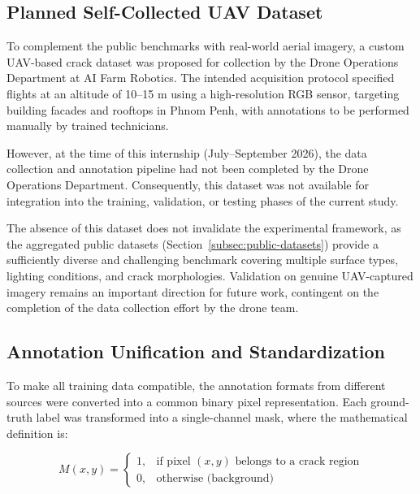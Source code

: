 
\subsection{Planned Self-Collected UAV Dataset}

\hs To complement the public benchmarks with real-world aerial imagery, a custom UAV-based crack dataset was proposed for collection by the Drone Operations Department at AI Farm Robotics. The intended acquisition protocol specified flights at an altitude of 10–15 m using a high-resolution RGB sensor, targeting building facades and rooftops in Phnom Penh, with annotations to be performed manually by trained technicians.

\hs However, at the time of this internship (July–September 2026), the data collection and annotation pipeline had not been completed by the Drone Operations Department. Consequently, this dataset was not available for integration into the training, validation, or testing phases of the current study.

\hs The absence of this dataset does not invalidate the experimental framework, as the aggregated public datasets (Section~\ref{subsec:public-datasets}) provide a sufficiently diverse and challenging benchmark covering multiple surface types, lighting conditions, and crack morphologies. Validation on genuine UAV-captured imagery remains an important direction for future work, contingent on the completion of the data collection effort by the drone team.

\subsection{Annotation Unification and Standardization}

\hs To make all training data compatible, the annotation formats from different sources were converted into a common binary pixel representation. Each ground-truth label was transformed into a single-channel mask, where the mathematical definition is:

\begin{equation}
    M(x, y) = \begin{cases}
        1, & \text{if pixel } (x, y) \text{ belongs to a crack region} \\
        0, & \text{otherwise (background)}
    \end{cases}
\end{equation}

